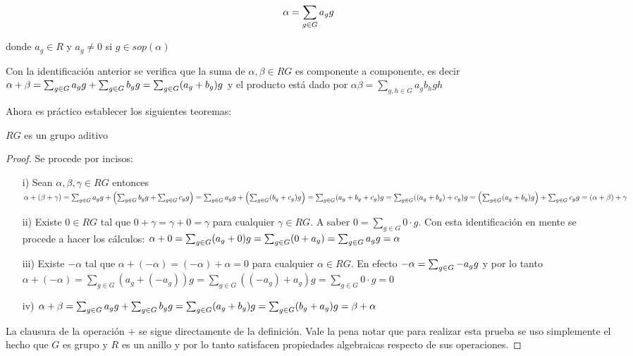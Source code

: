 \begin{equation}
\alpha = \sum_{g \in G} a_{g} g
\end{equation}


donde $a_g \in R$ y $a_g \neq 0$ si $g \in sop(\alpha)$


\begin{nota}
Con la identificación anterior se verifica que la suma de $\alpha, \beta \in RG$ es componente a componente, es decir $\alpha + \beta= \sum_{g \in G} a_{g} g+\sum_{g \in G} b_{g} g= \sum_{g\in G} (a_g+b_g)g $ y el producto está dado por $\alpha\beta=\sum_{g,h\in G}a_gb_hgh$

\end{nota}


Ahora es práctico establecer los siguientes teoremas:

\begin{teorema}\label{grupo}
$RG$ es un grupo aditivo

\end{teorema}

\begin{proof}
Se procede por incisos:
\begin{itemize}
\item[i)]  Sean $\alpha, \beta, \gamma \in RG$ entonces $\alpha+(\beta+\gamma)=\sum_{g \in G} a_{g} g+\left(\sum_{g \in G} b_{g} g+ \sum_{g \in G} c_{g} g \right)= \sum_{g \in G} a_{g} g+\left(\sum_{g\in G}(b_g+c_g)g\right)=\sum_{g\in G}(a_g+b_g+c_g)g= \sum_{g\in G}((a_g+b_g)+c_g)g=\left(\sum_{g\in G}(a_g+b_g)g \right) +\sum_{g \in G} c_{g} g=(\alpha+\beta)+\gamma $

\item[ii)] Existe $0 \in RG$ tal que $0+\gamma=\gamma+0=\gamma$ para cualquier $\gamma \in RG$. A saber $0=\sum_{g \in G}0\cdot g$. Con esta identificación en mente se procede a hacer los cálculos: $\alpha + 0 = \sum_{g \in G}(a_g+0)g=\sum_{g\in G}(0+a_g)=\sum_{g \in G} a_{g} g=\alpha$

\item[iii)] Existe $-\alpha$ tal que $\alpha+(-\alpha)= (-\alpha)+\alpha =0$ para cualquier $\alpha \in RG$. En efecto $-\alpha = \sum_{g \in G} -a_{g} g$ y por lo tanto $\alpha+ (-\alpha)=\sum_{g\in G}(a_g+(-a_g) )g= \sum_{g\in G}((-a_g)+a_g)g = \sum_{g \in G}0\cdot g = 0 $

\item[iv)] $\alpha + \beta = \sum_{g \in G} a_{g} g+\sum_{g \in G} b_{g} g=\sum_{g \in G}(a_g+b_g)g= \sum_{g \in G}(b_g+a_g)g=\beta + \alpha $ \qedhere
\end{itemize}

La clausura de la operación $+$  se sigue directamente de la definición. Vale la pena notar que para realizar esta prueba se uso simplemente el hecho que $G$ es grupo y $R$ es un anillo y por lo tanto satisfacen propiedades algebraicas respecto de sus operaciones.
\end{proof}

